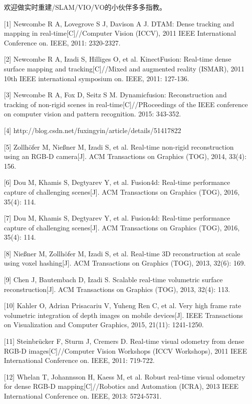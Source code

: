 欢迎做实时重建/SLAM/VIO/VO的小伙伴多多指教。

[1] Newcombe R A, Lovegrove S J, Davison A J. DTAM: Dense tracking and mapping in real-time[C]//Computer Vision (ICCV), 2011 IEEE International Conference on. IEEE, 2011: 2320-2327. 

[2] Newcombe R A, Izadi S, Hilliges O, et al. KinectFusion: Real-time dense surface mapping and tracking[C]//Mixed and augmented reality (ISMAR), 2011 10th IEEE international symposium on. IEEE, 2011: 127-136. 

[3] Newcombe R A, Fox D, Seitz S M. Dynamicfusion: Reconstruction and tracking of non-rigid scenes in real-time[C]//PRoceedings of the IEEE conference on computer vision and pattern recognition. 2015: 343-352. 

[4] http://blog.csdn.net/fuxingyin/article/details/51417822 

[5] Zollhöfer M, Nießner M, Izadi S, et al. Real-time non-rigid reconstruction using an RGB-D camera[J]. ACM Transactions on Graphics (TOG), 2014, 33(4): 156. 

[6] Dou M, Khamis S, Degtyarev Y, et al. Fusion4d: Real-time performance capture of challenging scenes[J]. ACM Transactions on Graphics (TOG), 2016, 35(4): 114. 

[7] Dou M, Khamis S, Degtyarev Y, et al. Fusion4d: Real-time performance capture of challenging scenes[J]. ACM Transactions on Graphics (TOG), 2016, 35(4): 114. 

[8] Nießner M, Zollhöfer M, Izadi S, et al. Real-time 3D reconstruction at scale using voxel hashing[J]. ACM Transactions on Graphics (TOG), 2013, 32(6): 169. 

[9] Chen J, Bautembach D, Izadi S. Scalable real-time volumetric surface reconstruction[J]. ACM Transactions on Graphics (TOG), 2013, 32(4): 113. 

[10] Kahler O, Adrian Prisacariu V, Yuheng Ren C, et al. Very high frame rate volumetric integration of depth images on mobile devices[J]. IEEE Transactions on Visualization and Computer Graphics, 2015, 21(11): 1241-1250. 

[11] Steinbrücker F, Sturm J, Cremers D. Real-time visual odometry from dense RGB-D images[C]//Computer Vision Workshops (ICCV Workshops), 2011 IEEE International Conference on. IEEE, 2011: 719-722. 

[12] Whelan T, Johannsson H, Kaess M, et al. Robust real-time visual odometry for dense RGB-D mapping[C]//Robotics and Automation (ICRA), 2013 IEEE International Conference on. IEEE, 2013: 5724-5731. 

